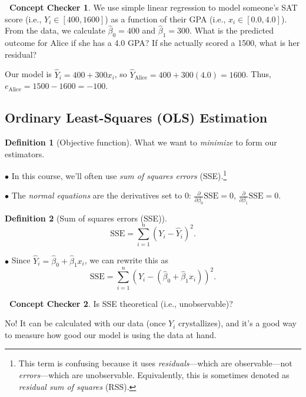 \documentclass[12pt,oneside]{article}
\newcommand{\SSE}{\text{SSE}}
\theoremstyle{definition}
\newtheorem{definition}{Definition}
\newtheorem{concept}{\faPen \ Concept Checker}
\theoremstyle{remark}
\begin{document}
\begin{concept}
We use simple linear regression to model someone's SAT score (i.e., $Y_i \in [400, 1600]$) as a function of their GPA (i.e., $x_i \in [0.0, 4.0]$). From the data, we calculate $\hat{\beta}_0 = 400$ and $\hat{\beta}_1 = 300$. What is the predicted outcome for Alice if she has a 4.0 GPA? If she actually scored a 1500, what is her residual?
\end{concept}

\begin{solutionbox}
Our model is $\hat{Y}_i = 400 + 300 x_i$, so $\hat{Y}_{\text{Alice}} = 400 + 300 (4.0) = 1600$. Thus, $e_{\text{Alice}} = 1500 - 1600 = -100$.
\end{solutionbox}

\subsection{Ordinary Least-Squares (OLS) Estimation}

\begin{definition}[Objective function]
What we want to \textit{minimize} to form our estimators.

$\bullet$ In this course, we'll often use \textit{sum of squares errors} (SSE).\footnote{This term is confusing because it uses \textit{residuals}—which are observable—not \textit{errors}—which are unobservable. Equivalently, this is sometimes denoted as \textit{residual sum of squares} (RSS).}

$\bullet$ The \textit{normal equations} are the derivatives set to $0$: $\frac{\partial}{\partial \beta_0} \SSE = 0$, $\frac{\partial}{\partial \beta_1} \SSE = 0$.
\end{definition}

\begin{definition}[Sum of squares errors (SSE)]
\[\SSE = \sum_{i = 1}^{n} (Y_i - \hat{Y}_i)^2.\]

$\bullet$ Since $\hat{Y}_i = \hat{\beta}_0 + \hat{\beta}_1 x_i$, we can rewrite this as \[\SSE = \sum_{i = 1}^{n} (Y_i - (\hat{\beta}_0 + \hat{\beta}_1 x_i))^2.\]
\end{definition}

\begin{concept}
Is SSE theoretical (i.e., unobservable)?
\end{concept}

\begin{solutionbox}
No! It can be calculated with our data (once $Y_i$ crystallizes), and it's a good way to measure how good our model is using the data at hand.
\end{solutionbox}
\end{document}
